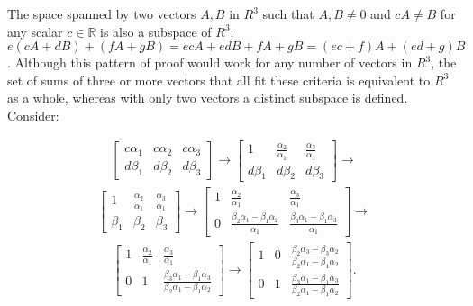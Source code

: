 \documentclass[12pt]{article}
\begin{document}
\begin{enumerate}
\begin{enumerate}
              The space spanned by two vectors $A,B$ in $R^3$ such that $A,B \neq 0$
              and $cA \neq B$ for any scalar $c \in \mathbb{R}$ is also a subspace of
              $R^3$; $e(cA + dB) + (fA + gB) = ecA + edB + fA + gB = (ec + f)A + (ed
              + g)B$.  Although this pattern of proof would work for any number of
              vectors in $R^3$, the set of sums of three or more vectors that all fit
              these criteria is equivalent to $R^3$ as a whole, whereas with only two
              vectors a distinct subspace is defined. Consider:

              \begin{align*}
                \begin{bmatrix}
                  c\alpha_1 & c\alpha_2 & c\alpha_3\\
                  d\beta_1 & d\beta_2 & d\beta_3
                \end{bmatrix}
                \xrightarrow{}
                \begin{bmatrix}
                  1 & \frac{\alpha_2}{\alpha_1} & \frac{\alpha_3}{\alpha_1}\\
                  d\beta_1 & d\beta_2 & d\beta_3
                \end{bmatrix}
                \xrightarrow{}
              \end{align*}
              \begin{align*}
                \begin{bmatrix}
                  1 & \frac{\alpha_2}{\alpha_1} & \frac{\alpha_3}{\alpha_1}\\
                  \beta_1 & \beta_2 & \beta_3
                \end{bmatrix}
                \xrightarrow{}
                \begin{bmatrix}
                  1 & \frac{\alpha_2}{\alpha_1} & \frac{\alpha_3}{\alpha_1}\\
                  0 & \frac{\beta_2\alpha_1 - \beta_1\alpha_2}{\alpha_1} & \frac{\beta_3\alpha_1 -\beta_1\alpha_3}{\alpha_1}
                \end{bmatrix}
                \xrightarrow{}
              \end{align*}
              \begin{align*}
                \begin{bmatrix}
                  1 & \frac{\alpha_2}{\alpha_1} & \frac{\alpha_3}{\alpha_1}\\
                  0 & 1 & \frac{\beta_3\alpha_1 -\beta_1\alpha_3}{\beta_2\alpha_1 - \beta_1\alpha_2}
                \end{bmatrix}
                \xrightarrow{}
                \begin{bmatrix}
                  1 & 0 & \frac{\beta_2\alpha_3-\beta_3\alpha_2}
                               {\beta_2\alpha_1-\beta_1\alpha_2}\\
                  0 & 1 & \frac{\beta_3\alpha_1 -\beta_1\alpha_3}
                               {\beta_2\alpha_1 - \beta_1\alpha_2}
                \end{bmatrix}.
              \end{align*}


\end{enumerate}
\end{enumerate}
\end{document}
